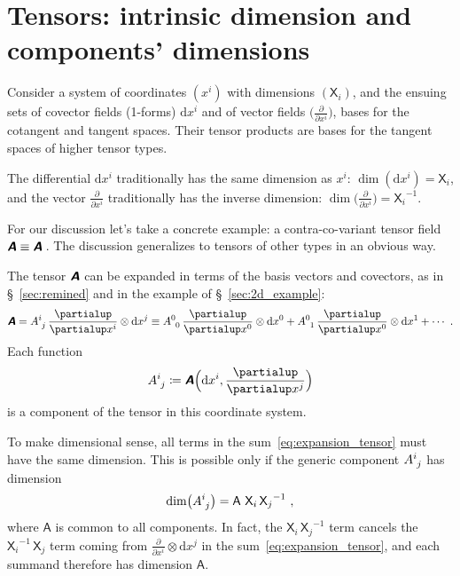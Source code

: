\documentclass[\ifafour a4paper,12pt,\else a5paper,10pt,\fi%
onecolumn,oneside,article,%
british%
]{memoir}
\makeatletter
\theoremstyle{remark}
\theoremstyle{innote}
\newcommand*{\mathte}[1]{\textbf{\textit{\textsf{#1}}}}
\newcommand*{\de}{\partialup}%
\newcommand*{\di}{\mathrm{d}}%
\newcommand*{\defd}{\coloneqq}
\renewcommand*{\|}[1][]{\nonscript\,#1\vert\nonscript\;\mathopen{}}
\newcommand*{\sect}{\S}%
\newcommand*{\q}{}%
\DeclareRobustCommand*{\q}{%
  \mathord{\mathpalette\bigcdot@{}}%
}
\newcommand*{\bigcdot@scalefactor}{0.7}
\newcommand*{\bigcdot@widthfactor}{1.5}
\newcommand*{\bigcdot@}[2]{%
  \sbox0{$#1\vcenter{}$}%
  \sbox2{$#1\cdot\m@th$}%
  \hbox to \bigcdot@widthfactor\wd2{%
    \hfil
    \raise\ht0\hbox{%
      \scalebox{\bigcdot@scalefactor}{%
        \lower\ht0\hbox{$#1\bullet\m@th$}%
      }%
    }%
    \hfil
  }%
}
\newcommand*{\Xx}{\textsf{X}}
\newcommand*{\Aa}{\textsf{A}}
\newcommand*{\yA}{\mathte{A}}
\renewcommand*{\i}{\indices}
\newcommand*{\dex}[1][i]{\frac{\de}{\de x^{#1}}}
\newcommand*{\dix}[1][i]{\di x^{#1}}
\makeatother
\begin{document}
\section{Tensors: intrinsic dimension and components' dimensions}
\label{sec:tensors}

Consider a system of coordinates $(x^i)$ with dimensions $(\Xx_i)$, and the
ensuing sets of covector fields (1-forms) $\dix$ and of vector fields
$\bigl(\dex\bigr)$, bases for the cotangent and tangent spaces. Their
tensor products are bases for the tangent spaces of higher tensor types.

The differential $\dix$ traditionally has the same dimension as $x^{i}$:
$\dim(\dix) = \Xx_{i}$, and the vector $\dex$ traditionally has the
inverse dimension: $\dim\bigl(\dex\bigr) = {\Xx_{i}}^{-1}$.

For our discussion let's take a concrete example: a contra-co-variant tensor
field $\yA \equiv \yA\i{^{\q}_{\q}}\,$. The discussion generalizes to tensors
of other types in an obvious way.

The tensor $\yA$ can be expanded in terms of the basis vectors and
covectors, as in \sect~\ref{sec:remined} and in the example of
\sect~\ref{sec:2d_example}:
\begin{equation}
  \label{eq:expansion_tensor}
  \yA = A\i{^{i}_{j}}\, \dex\otimes\dix[j]
  \equiv A\i{^{0}_{0}}\,\dex[0]\otimes\dix[0] + 
  A\i{^{0}_{1}}\,\dex[0]\otimes\dix[1] + \dotsb {}\ .
\end{equation}
Each function
\begin{equation}
  A\i{^{i}_{j}} \defd  \yA\Bigl(\dix, \dex[j]\Bigr)
  \label{eq:components_def}
\end{equation}
is a component of the tensor in this coordinate system.

\medskip

To make dimensional sense, all terms in the sum~\eqref{eq:expansion_tensor}
must have the same dimension. This is possible only if the generic
component $A\i{^{i}_{j}}$ has dimension
\begin{equation}
  \label{eq:dim_component}
  \dim\bigl(A\i{^{i}_{j}}\bigr) = \Aa\ {\Xx_{i}}\,{\Xx_{j}}^{-1}\ ,
\end{equation}
where $\Aa$ is common to all components. In fact, the
${\Xx_{i}}\,{\Xx_{j}}^{-1}$ term cancels the ${\Xx_{i}}^{-1}\,{\Xx_{j}}$
term coming from $\dex\otimes\dix[j]$ in the
sum~\eqref{eq:expansion_tensor}, and each summand therefore has dimension
$\Aa$.
\end{document}
